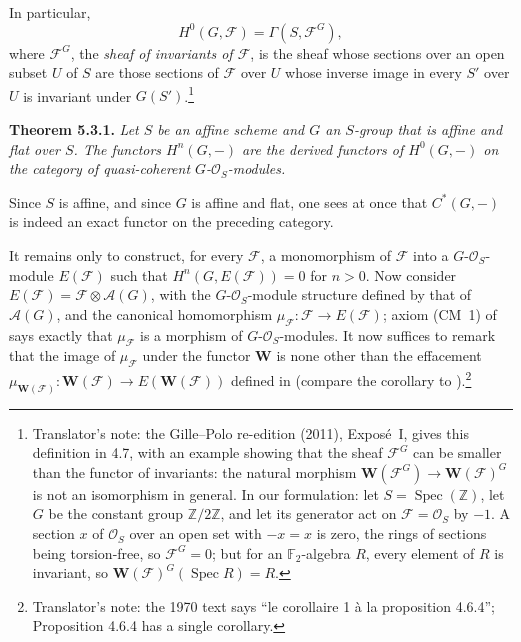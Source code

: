 In particular,
\[
  H^0(G,\mathscr F)=\Gamma(S,\mathscr F^G),
\]
where \(\mathscr F^G\), the \emph{sheaf of invariants of \(\mathscr F\)},
is the sheaf whose sections over an open subset \(U\) of \(S\) are those
sections of \(\mathscr F\) over \(U\) whose inverse image in every
\(S'\) over \(U\) is invariant under \(G(S')\).\footnote{Translator's note: the Gille--Polo re-edition (2011), Exposé~I, gives this
definition in 4.7, with an example showing that the sheaf
\(\mathscr F^G\) can be smaller than the functor of invariants: the natural
morphism \(\mathbf W(\mathscr F^G)\to\mathbf W(\mathscr F)^G\) is not an
isomorphism in general. In our formulation: let \(S=\operatorname{Spec}(\mathbb Z)\),
let \(G\) be the constant group \(\mathbb Z/2\mathbb Z\), and let its
generator act on \(\mathscr F=\mathcal O_S\) by \(-1\). A section \(x\) of
\(\mathcal O_S\) over an open set with \(-x=x\) is zero, the rings of
sections being torsion-free, so \(\mathscr F^G=0\); but for an
\(\mathbb F_2\)-algebra \(R\), every element of \(R\) is invariant, so
\(\mathbf W(\mathscr F)^G(\operatorname{Spec}R)=R\).}

\medskip
\noindent{}\textbf{Theorem 5.3.1.}
\textit{Let \(S\) be an affine scheme and \(G\) an \(S\)-group that is
affine and flat over \(S\). The functors \(H^n(G,-)\) are the derived
functors of \(H^0(G,-)\) on the category of quasi-coherent
\(G\)-\(\mathscr O_S\)-modules.}

Since \(S\) is affine, and since \(G\) is affine and flat, one sees at once
that \(C^*(G,-)\) is indeed an exact functor on the preceding category.

It remains only to construct, for every \(\mathscr F\), a monomorphism of
\(\mathscr F\) into a \(G\)-\(\mathscr O_S\)-module \(E(\mathscr F)\) such
that \(H^n(G,E(\mathscr F))=0\) for \(n>0\). Now consider
\(E(\mathscr F)=\mathscr F\otimes\mathscr A(G)\), with the
\(G\)-\(\mathscr O_S\)-module structure defined by that of
\(\mathscr A(G)\), and the canonical homomorphism
\(\mu_{\mathscr F}:\mathscr F\to E(\mathscr F)\); axiom (CM~1) of
 says exactly that \(\mu_{\mathscr F}\) is a morphism of
\(G\)-\(\mathscr O_S\)-modules. It now suffices to remark that the image of
\(\mu_{\mathscr F}\) under the functor \(\mathbf W\) is none other than the
effacement
\(\mu_{\mathbf W(\mathscr F)}:\mathbf W(\mathscr F)\to E(\mathbf W(\mathscr F))\)
defined in  (compare the corollary to
).\footnote{Translator's note: the 1970 text says ``le corollaire 1 à la
proposition 4.6.4''; Proposition 4.6.4 has a single corollary.}

